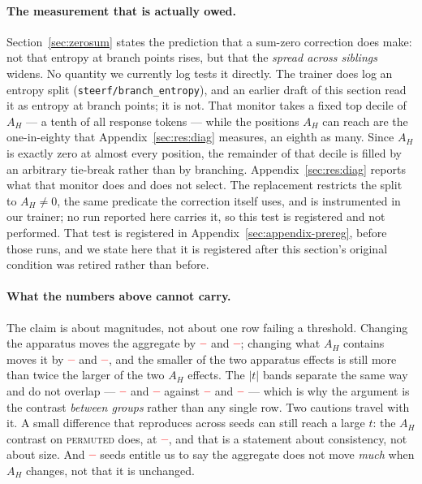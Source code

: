 \documentclass[11pt]{article}
\newcommand{\AH}{A_{H}}
\providecommand{\PENDING}{\textcolor{red}{\textbf{--}}}
\newcommand{\num}[1]{\ifcsname #1\endcsname\csname #1\endcsname\else\PENDING\fi}
\begin{document}
\paragraph{The measurement that is actually owed.} Section~\ref{sec:zerosum} states
the prediction that a sum-zero correction does make: not that entropy at branch
points rises, but that the \emph{spread across siblings} widens. No quantity we
currently log tests it directly. The trainer does log an entropy split
(\texttt{steerf/branch\_entropy}), and an earlier draft of this section read it as
entropy at branch points; it is not. That monitor takes a fixed top decile of
$\AH$ --- a tenth of all response tokens --- while the positions $\AH$ can reach are
the one-in-eighty that Appendix~\ref{sec:res:diag} measures, an eighth as many. Since
$\AH$ is exactly zero at almost every position, the remainder of that decile is
filled by an arbitrary tie-break rather than by branching. Appendix~\ref{sec:res:diag} reports
what that monitor does and does not select. The replacement restricts the split to
$\AH \ne 0$, the same predicate the correction itself uses, and is instrumented in
our trainer; no run reported here carries it, so this test is registered and not
performed. That test is registered
in Appendix~\ref{sec:appendix-prereg}, before those runs, and we state here that it
is registered after this section's original condition was retired rather than
before.

\paragraph{What the numbers above cannot carry.} The claim is about magnitudes, not
about one row failing a threshold. Changing the apparatus moves the aggregate by
$\num{Cuniformsteerentropy}$ and $\num{Csteergrpoentropy}$; changing what $\AH$
contains moves it by $\num{Csignedpermutedentropy}$ and
$\num{Csigneduniformentropy}$, and the smaller of the two apparatus effects is still
more than twice the larger of the two $\AH$ effects. The $|t|$ bands separate the
same way and do not overlap --- $\num{Tsteergrpoentropy}$ and
$\num{Tuniformsteerentropy}$ against $\num{Tsigneduniformentropy}$ and
$\num{Tsignedpermutedentropy}$ --- which is why the argument is the contrast
\emph{between groups} rather than any single row. Two cautions travel with it. A
small difference that reproduces across seeds can still reach a large $t$: the
$\AH$ contrast on \textsc{permuted} does, at $\num{Csignedpermutedentropy}$, and
that is a statement about consistency, not about size. And $\num{Nsigneduniform}$
seeds entitle us to say the aggregate does not move \emph{much} when $\AH$ changes,
not that it is unchanged.
\end{document}
